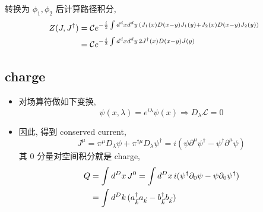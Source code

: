 \begin{itemize}
	\begin{tcolorbox}[title=calculation:]
		转换为 $\phi_1, \phi_2$ 后计算路径积分,
		\begin{align}
			Z(J, J^\dag) &= \mathcal{C} e^{- \frac{i}{2} \int d^d x d^d y \, (J_1(x) D(x - y) J_1(y) + J_2(x) D(x - y) J_2(y))} \notag \\
			&= \mathcal{C} e^{- \frac{i}{2} \int d^d x d^d y \, 2 J^\dag(x) D(x - y) J(y)}
		\end{align}
	\end{tcolorbox}
\end{itemize}

\subsection{charge}
\begin{itemize}
	\item 对场算符做如下变换,
	\begin{equation}
		\psi(x, \lambda) = e^{i \lambda} \psi(x) \Longrightarrow D_\lambda \mathcal{L} = 0
	\end{equation}
	
	\item 因此, 得到 conserved current,
	\begin{equation}
		J^\mu = \pi^\mu D_\lambda \psi + \pi^{\dag \mu} D_\lambda \psi^{\dag} = i (\psi \partial^\mu \psi^\dag - \psi^\dag \partial^\mu \psi)
	\end{equation}
	其 $0$ 分量对空间积分就是 charge,
	\begin{align}
		Q &= \int d^D x \, J^0 = \int d^D x \, i (\psi^\dag \partial_0 \psi - \psi \partial_0 \psi^\dag) \notag \\
		&= \int d^D k \, (a^\dag_{\vec{k}} a_{\vec{k}} - b^\dag_{\vec{k}} b_{\vec{k}})
	\end{align}
	

\end{itemize}
